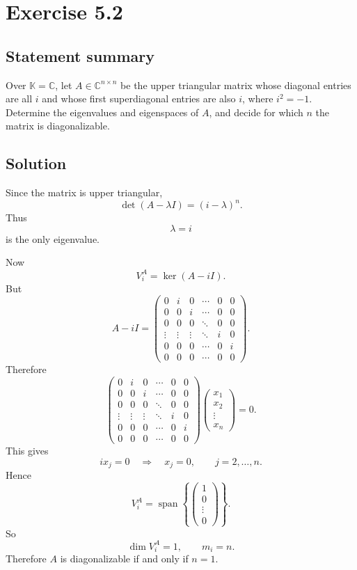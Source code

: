 \documentclass[11pt,a4paper]{article}
\newcommand{\C}{\mathbb{C}}
\newcommand{\K}{\mathbb{K}}
\newcommand{\Span}{\operatorname{span}}
\begin{document}
\newpage
\section*{Exercise 5.2}

\subsection*{Statement summary}
Over $\K=\C$, let $A\in\C^{n\times n}$ be the upper triangular matrix whose diagonal entries are all $i$ and whose first superdiagonal entries are also $i$, where $i^2=-1$. Determine the eigenvalues and eigenspaces of $A$, and decide for which $n$ the matrix is diagonalizable.

\subsection*{Solution}
Since the matrix is upper triangular,
\[
\det(A-\lambda I)=(i-\lambda)^n.
\]
Thus
\[
\lambda=i
\]
is the only eigenvalue.

Now
\[
V_i^A=\ker(A-iI).
\]
But
\[
A-iI=\begin{pmatrix}
0&i&0&\cdots&0&0\\
0&0&i&\cdots&0&0\\
0&0&0&\ddots&0&0\\
\vdots&\vdots&\vdots&\ddots&i&0\\
0&0&0&\cdots&0&i\\
0&0&0&\cdots&0&0
\end{pmatrix}.
\]
Therefore
\[
\begin{pmatrix}
0&i&0&\cdots&0&0\\
0&0&i&\cdots&0&0\\
0&0&0&\ddots&0&0\\
\vdots&\vdots&\vdots&\ddots&i&0\\
0&0&0&\cdots&0&i\\
0&0&0&\cdots&0&0
\end{pmatrix}
\begin{pmatrix}
x_1\\x_2\\\vdots\\x_n
\end{pmatrix}=0.
\]
This gives
\[
ix_j=0\quad\Rightarrow\quad x_j=0,
\qquad j=2,\dots,n.
\]
Hence
\[
V_i^A=\Span\left\{\begin{pmatrix}1\\0\\\vdots\\0\end{pmatrix}\right\}.
\]
So
\[
\dim V_i^A=1,
\qquad
m_i=n.
\]
Therefore $A$ is diagonalizable if and only if $n=1$.
\end{document}
